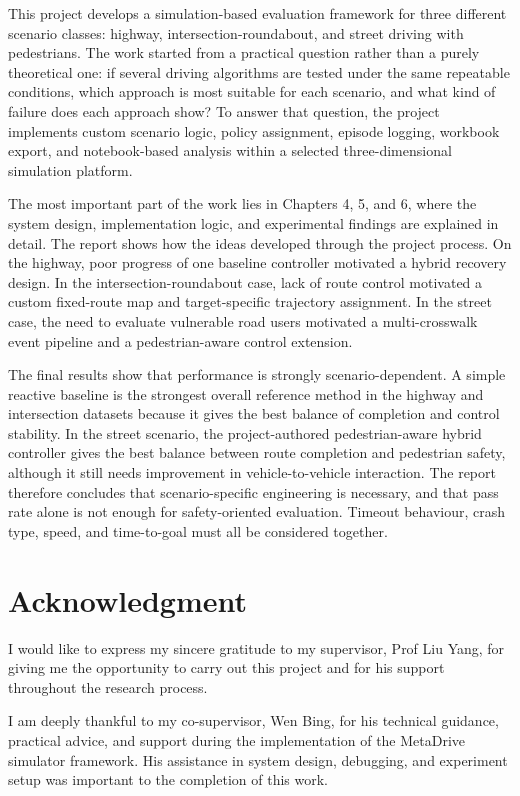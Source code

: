 \documentclass[12pt,a4paper]{report}
\begin{document}
This project develops a simulation-based evaluation framework for three different scenario classes: highway, intersection-roundabout, and street driving with pedestrians. The work started from a practical question rather than a purely theoretical one: if several driving algorithms are tested under the same repeatable conditions, which approach is most suitable for each scenario, and what kind of failure does each approach show? To answer that question, the project implements custom scenario logic, policy assignment, episode logging, workbook export, and notebook-based analysis within a selected three-dimensional simulation platform.

The most important part of the work lies in Chapters 4, 5, and 6, where the system design, implementation logic, and experimental findings are explained in detail. The report shows how the ideas developed through the project process. On the highway, poor progress of one baseline controller motivated a hybrid recovery design. In the intersection-roundabout case, lack of route control motivated a custom fixed-route map and target-specific trajectory assignment. In the street case, the need to evaluate vulnerable road users motivated a multi-crosswalk event pipeline and a pedestrian-aware control extension.

The final results show that performance is strongly scenario-dependent. A simple reactive baseline is the strongest overall reference method in the highway and intersection datasets because it gives the best balance of completion and control stability. In the street scenario, the project-authored pedestrian-aware hybrid controller gives the best balance between route completion and pedestrian safety, although it still needs improvement in vehicle-to-vehicle interaction. The report therefore concludes that scenario-specific engineering is necessary, and that pass rate alone is not enough for safety-oriented evaluation. Timeout behaviour, crash type, speed, and time-to-goal must all be considered together.

\chapter*{Acknowledgment}
I would like to express my sincere gratitude to my supervisor, Prof Liu Yang, for giving me the opportunity to carry out this project and for his support throughout the research process.

I am deeply thankful to my co-supervisor, Wen Bing, for his technical guidance, practical advice, and support during the implementation of the MetaDrive simulator framework. His assistance in system design, debugging, and experiment setup was important to the completion of this work.
\end{document}
